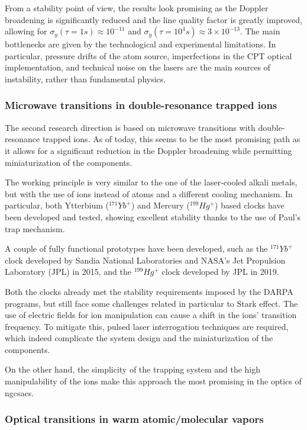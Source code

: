 From a stability point of view, the results look promising as the Doppler broadening is significantly reduced and the line quality factor is greatly improved, allowing for $\sigma_y(\tau=1s) \approx 10^{-11}$ and $\sigma_y(\tau=10^4s) \approx 3 \times 10^{-13}$.
The main bottlenecks are given by the technological and experimental limitations.
In particular, pressure drifts of the atom source, imperfections in the CPT optical implementation, and technical noise on the lasers are the main sources of instability, rather than fundamental physics.


\subsubsection{Microwave transitions in double-resonance trapped ions}
\label{subsubsec:double_resonance_ions}

The second research direction is based on microwave transitions with double-resonance trapped ions.
As of today, this seems to be the most promising path as it allows for a significant reduction in the Doppler broadening while permitting miniaturization of the components.

The working principle is very similar to the one of the laser-cooled alkali metals, but with the use of ions instead of atoms and a different cooling mechanism.
In particular, both Ytterbium ($^{171}Yb^+$) and Mercury ($^{199}Hg^+$) based clocks have been developed and tested, showing excellent stability thanks to the use of Paul's trap mechanism.

A couple of fully functional prototypes have been developed, such as the $^{171}Yb^+$ clock developed by Sandia National Laboratories and NASA's Jet Propulsion Laboratory (JPL) in 2015, and the $^{199}Hg^+$ clock developed by JPL in 2019.

Both the clocks already met the stability requirements imposed by the DARPA programs, but still face some challenges related in particular to Stark effect.
The use of electric fields for ion manipulation can cause a shift in the ions' transition frequency.
To mitigate this, pulsed laser interrogation techniques are required, which indeed complicate the system design and the miniaturization of the components.

On the other hand, the simplicity of the trapping system and the high manipulability of the ions make this approach the most promising in the optics of \acrshort{ngcsacs}.


\subsubsection{Optical transitions in warm atomic/molecular vapors}
\label{subsubsec:optical_transitions}

